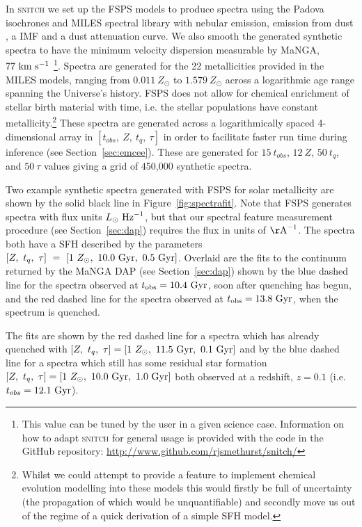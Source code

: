 \documentclass[useAMS,usenatbib]{mn2e}
\begin{document}
In \textsc{snitch} we set up the FSPS models to produce spectra using the Padova isochrones \citep{girardi02} and MILES spectral library \citep{vazdekis16} with nebular emission, emission from dust \cite{draineli07}, a \cite{chabrier03} IMF and a \cite{calzetti00} dust attenuation curve. We also smooth the generated synthetic spectra to have the minimum velocity dispersion measurable by MaNGA, $77~\rm{km}~{s}^{-1}$ \citep{bundy15}\footnote{This value can be tuned by the user in a given science case. Information on how to adapt \textsc{snitch} for general usage is provided with the code in the GitHub repository: \url{http://www.github.com/rjsmethurst/snitch/}}. Spectra are generated for the 22 metallicities provided in the MILES models, ranging from $0.011~Z_{\odot}$ to $1.579~Z_{\odot}$ across a logarithmic age range spanning the Universe's history. FSPS does not allow for chemical enrichment of stellar birth material with time, i.e. the stellar populations have constant metallicity.\footnote{Whilst we could attempt to provide a feature to implement chemical evolution modelling into these models this would firstly be full of uncertainty (the propagation of which would be unquantifiable) and secondly move us out of the regime of a quick derivation of a simple SFH model.} These spectra are generated across a logarithmically spaced 4-dimensional array in $[t_{obs},~Z,~t_q,~\tau]$ in order to facilitate faster run time during inference (see Section~\ref{sec:emcee}). These are generated for $15~t_{obs}$, $12~Z$, $50~t_q$, and $50~\tau$ values giving a grid of 450,000 synthetic spectra.

Two example synthetic spectra generated with FSPS for solar metallicity are shown by the solid black line in Figure~\ref{fig:spectrafit}. Note that FSPS generates spectra with flux units $L_{\odot}~\rm{Hz}^{-1}$, but that our spectral feature measurement procedure (see Section~\ref{sec:dap}) requires the flux in units of $\rm{\AA}^{-1}$. The spectra both have a SFH described by the parameters $[Z,~t_q,~\tau]~=~[1~Z_{\odot},~10.0~\rm{Gyr},~0.5~\rm{Gyr}]$. Overlaid are the fits to the continuum returned by the MaNGA DAP (see Section~\ref{sec:dap}) shown by the blue dashed line for the spectra observed at $t_{\rm{obs}} = 10.4~\rm{Gyr}$, soon after quenching has begun, and the red dashed line for the spectra observed at $t_{\rm{obs}} = 13.8~\rm{Gyr}$, when the spectrum is quenched.

 The fits are shown by the red dashed line for a spectra which has already quenched with $[Z,~t_q,~\tau] = [1~Z_{\odot},~11.5~\rm{Gyr},~0.1~\rm{Gyr}]$ and by the blue dashed line for a spectra which still has some residual star formation $[Z,~t_q,~\tau] = [1~Z_{\odot},~10.0~\rm{Gyr},~1.0~\rm{Gyr}]$ both observed at a redshift, $z=0.1$ (i.e. $t_{obs}=12.1~\rm{Gyr}$). 
\end{document}
